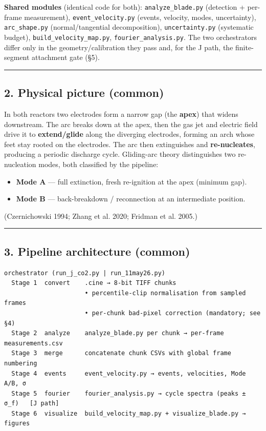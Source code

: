\documentclass[
  11pt,
]{article}
\providecommand{\tightlist}{%
  \setlength{\itemsep}{0pt}\setlength{\parskip}{0pt}}
\begin{document}
\textbf{Shared modules} (identical code for both):
\texttt{analyze\_blade.py} (detection + per-frame measurement),
\texttt{event\_velocity.py} (events, velocity, modes, uncertainty),
\texttt{arc\_shape.py} (normal/tangential decomposition),
\texttt{uncertainty.py} (systematic budget),
\texttt{build\_velocity\_map.py}, \texttt{fourier\_analysis.py}. The two
orchestrators differ only in the geometry/calibration they pass and, for
the J path, the finite-segment attachment gate (§5).

\begin{center}\rule{0.5\linewidth}{0.5pt}\end{center}

\hypertarget{2-physical-picture-common}{%
\subsection{2. Physical picture
(common)}\label{2-physical-picture-common}}

In both reactors two electrodes form a narrow gap (the \textbf{apex})
that widens downstream. The arc breaks down at the apex, then the gas
jet and electric field drive it to \textbf{extend/glide} along the
diverging electrodes, forming an arch whose feet stay rooted on the
electrodes. The arc then extinguishes and \textbf{re-nucleates},
producing a periodic discharge cycle. Gliding-arc theory distinguishes
two re-nucleation modes, both classified by the pipeline:

\begin{itemize}
\tightlist
\item
  \textbf{Mode A} --- full extinction, fresh re-ignition at the apex
  (minimum gap).
\item
  \textbf{Mode B} --- back-breakdown / reconnection at an intermediate
  position.
\end{itemize}

(Czernichowski 1994; Zhang et al. 2020; Fridman et al. 2005.)

\begin{center}\rule{0.5\linewidth}{0.5pt}\end{center}

\hypertarget{3-pipeline-architecture-common}{%
\subsection{3. Pipeline architecture
(common)}\label{3-pipeline-architecture-common}}

\begin{verbatim}
orchestrator (run_j_co2.py | run_11may26.py)
  Stage 1  convert    .cine → 8-bit TIFF chunks
                      • percentile-clip normalisation from sampled frames
                      • per-chunk bad-pixel correction (mandatory; see §4)
  Stage 2  analyze    analyze_blade.py per chunk → per-frame measurements.csv
  Stage 3  merge      concatenate chunk CSVs with global frame numbering
  Stage 4  events     event_velocity.py → events, velocities, Mode A/B, σ
  Stage 5  fourier    fourier_analysis.py → cycle spectra (peaks ± σ_f)   [J path]
  Stage 6  visualize  build_velocity_map.py + visualize_blade.py → figures
\end{verbatim}
\end{document}
